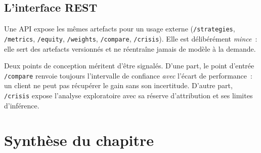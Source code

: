 \subsection{L'interface REST}

Une API expose les mêmes artefacts pour un usage externe (\texttt{/strategies},
\texttt{/metrics}, \texttt{/equity}, \texttt{/weights}, \texttt{/compare},
\texttt{/crisis}). Elle est délibérément \emph{mince}~: elle sert des artefacts
versionnés et ne réentraîne jamais de modèle à la demande.

Deux points de conception méritent d'être signalés. D'une part, le point d'entrée
\texttt{/compare} renvoie toujours l'intervalle de confiance \emph{avec} l'écart
de performance~: un client ne peut pas récupérer le gain sans son incertitude.
D'autre part, \texttt{/crisis} expose l'analyse exploratoire avec sa réserve
d'attribution et ses limites d'inférence.

\section*{Synthèse du chapitre}

